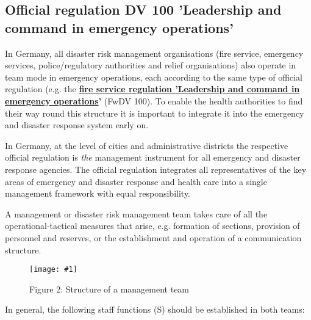 \documentclass{article}
\newlength{\imgwidth}
\newcommand\scaledgraphics[2]{%
                
\settowidth{\imgwidth}{\texttt{[image: \#1]}}%
                
\setlength{\imgwidth}{\minof{\imgwidth}{#2\textwidth}}%
                
\texttt{[image: \#1]}%
                
}
\begin{document}
\subsection{Official regulation DV 100 'Leadership and command in emergency operations'}\label{H153399}



In Germany, all disaster risk management organisations (fire service, emergency services, police/regulatory authorities and relief organisations) also operate in team mode in emergency operations, each according to the same type of official regulation (e.g. the \textbf{\href{https://www.bbk.bund.de/SharedDocs/Downloads/BBK/DE/FIS/DownloadsRechtundVorschriften/Volltext_Fw_Dv/FwDV%20100.pdf}{fire service regulation 'Leadership and command in emergency operations}}\textbf{'} (FwDV 100). To enable the health authorities to find their way round this structure it is important to integrate it into the emergency and disaster response system early on.


In Germany, at the level of cities and administrative districts the respective official regulation is \emph{the} management instrument for all emergency and disaster response agencies. The official regulation integrates all representatives of the key areas of emergency and disaster response and health care into a single management framework with equal responsibility.


A management or disaster risk management team takes care of all the operational-tactical measures that arise, e.g. formation of sections, provision of personnel and reserves, or the establishment and operation of a communication structure.

\begin{figure}
\scaledgraphics{90bfad67-6e8a-4cc6-b7c8-76ac64997bf0.png}{1}
\caption*{Figure 2: \emph{\textbf{ }}Structure of a management team}\label{F75946271}
\end{figure}


In general, the following staff functions (S) should be established in both teams:
\end{document}
